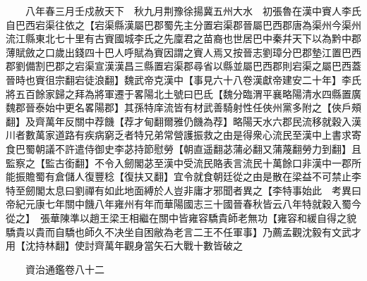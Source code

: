 　　八年春三月壬戍赦天下　秋九月荆豫徐揚冀五州大水　初張魯在漢中賨人李氏自巴西宕渠往依之【宕渠縣漢屬巴郡蜀先主分置宕渠郡晉屬巴西郡唐為渠州今渠州流江縣東北七十里有古賨國城李氏之先廩君之苗裔也世居巴中秦幷天下以為黔中郡薄賦斂之口歲出錢四十巴人呼賦為賨因謂之賨人焉又按晉志劉璋分巴郡墊江置巴西郡劉備割巴郡之宕渠宣漢漢昌三縣置宕渠郡尋省以縣並屬巴西郡則宕渠之屬巴西蓋晉時也賨徂宗翻宕徒浪翻】魏武帝克漢中【事見六十八卷漢獻帝建安二十年】李氏將五百餘家歸之拜為將軍遷于畧陽北土號曰巴氐【魏分臨渭平襄略陽清水四縣置廣魏郡晉泰始中更名畧陽郡】其孫特庠流皆有材武善騎射性任俠州黨多附之【俠戶頰翻】及齊萬年反關中荐饑【荐才甸翻爾雅仍饑為荐】略陽天水六郡民流移就穀入漢川者數萬家道路有疾病窮乏者特兄弟常營護振救之由是得衆心流民至漢中上書求寄食巴蜀朝議不許遣侍御史李苾持節慰勞【朝直遥翻苾蒲必翻又蒲蔑翻勞力到翻】且監察之【監古銜翻】不令入劒閣苾至漢中受流民賂表言流民十萬餘口非漢中一郡所能振贍蜀有倉儲人復豐稔【復扶又翻】宜令就食朝廷從之由是散在梁益不可禁止李特至劒閣太息曰劉禪有如此地面縛於人豈非庸才邪聞者異之【李特事始此　考異曰帝紀元康七年關中饑八年雍州有年而華陽國志三十國晉春秋皆云八年特就穀入蜀今從之】　張華陳準以趙王梁王相繼在關中皆雍容驕貴師老無功【雍容和緩自得之貌驕貴以貴而自驕也師久不决坐自困敝為老言二王不任軍事】乃薦孟觀沈毅有文武才用【沈持林翻】使討齊萬年觀身當矢石大戰十數皆破之

　　資治通鑑卷八十二


    


 


 



 

 
  







 


　　
　　
　
　
　


　　

　















	
	









































